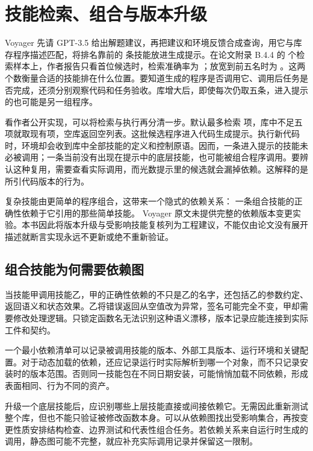 \section{技能检索、组合与版本升级}
\label{sec:ch08-retrieve}

Voyager 先请 GPT-3.5 给出解题建议，再把建议和环境反馈合成查询，用它与库存程序描述匹配，将排名靠前的  条技能放进生成提示\cite{voyager-2305}。在论文附录 B.4.4 的  个检索样本上，作者报告只看首位候选时，检索准确率为 ；放宽到前五名时为 。这两个数衡量合适的技能排在什么位置。要知道生成的程序是否调用它、调用后任务是否完成，还须分别观察代码和任务验收。库增大后，即使每次仍取五条，进入提示的也可能是另一组程序。

看作者公开实现，可以将检索与执行再分清一步。默认最多检索  项，库中不足五项就取现有项，空库返回空列表。这批候选程序进入代码生成提示。执行新代码时，环境却会收到库中全部技能的定义和控制原语。因而，一条进入提示的技能未必被调用；一条当前没有出现在提示中的底层技能，也可能被组合程序调用。要辨认这种复用，需要查看实际调用，而光数提示里的候选就会漏掉依赖。这解释的是所引代码版本的行为\cite{voyager-code-55e45a8}。

复杂技能由更简单的程序组合\cite{voyager-2305}，这带来一个隐式的依赖关系：
一条组合技能的正确性依赖于它引用的那些简单技能。
Voyager 原文未提供完整的依赖版本变更实验\cite{voyager-2305}。本书因此将版本升级与受影响技能复核列为工程建议，不能仅由论文没有展开描述就断言实现永远不更新或绝不重新验证。

\subsection{组合技能为何需要依赖图}
\label{sec:ch08-dependencies}

当技能甲调用技能乙，甲的正确性依赖的不只是乙的名字，还包括乙的参数约定、返回语义和状态效果。乙将错误返回从空值改为异常，签名可能完全不变，甲却需要修改处理逻辑。只锁定函数名无法识别这种语义漂移，版本记录应能连接到实际工件和契约。

一个最小依赖清单可以记录被调用技能的版本、外部工具版本、运行环境和关键配置。对于动态加载的依赖，还应记录运行时实际解析到哪一个对象，而不只记录安装时的版本范围。否则同一技能包在不同日期安装，可能悄悄加载不同依赖，形成表面相同、行为不同的资产。

升级一个底层技能后，应识别哪些上层技能直接或间接依赖它。无需因此重新测试整个库，但也不能只验证被修改函数本身。可以从依赖图找出受影响集合，再按变更性质安排结构检查、边界测试和代表性组合任务。若依赖关系来自运行时生成的调用，静态图可能不完整，就应补充实际调用记录并保留这一限制。

